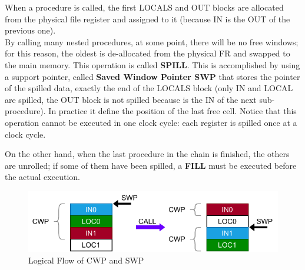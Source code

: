 When a procedure is called, the first LOCALS and OUT blocks are allocated from the physical file register and assigned to it (because IN is the OUT of the previous one).\\

By calling many nested procedures, at some point, there will be no free windows; for this reason, the oldest is de-allocated from the physical FR and swapped to the main memory. This operation is called \textbf{SPILL}. This is accomplished by using a support pointer, called \textbf{Saved Window Pointer SWP} that stores the pointer of the spilled data, exactly the end of the LOCALS block (only IN and LOCAL are spilled, the OUT block is not spilled because is the IN of the next sub-procedure). In practice it define the position of the last free cell. Notice that this operation cannot be executed in one clock cycle: each register is spilled once at a clock cycle.\newline\newline

On the other hand, when the last procedure in the chain is finished, the others are unrolled; if some of them have been spilled, a \textbf{FILL} must be executed before the actual execution.\newline\newline

\begin{figure}[H]
    \centering
    \includegraphics[width=1.0\textwidth]{chapters/4_DecodeStage/images/DLX_RF_CWP_SWP.pdf}
    \caption{Logical Flow of CWP and SWP}
    \label{cwp_swp}
\end{figure}

